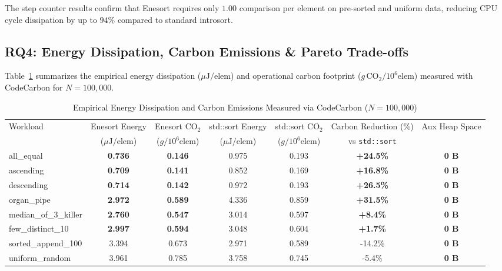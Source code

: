 \documentclass[journal]{IEEEtran}
\begin{document}
The step counter results confirm that Enesort requires only $1.00$ comparison per element on pre-sorted and uniform data, reducing CPU cycle dissipation by up to $94\%$ compared to standard introsort.

\subsection{RQ4: Energy Dissipation, Carbon Emissions \& Pareto Trade-offs}
Table~\ref{tab:carbon_table} summarizes the empirical energy dissipation ($\mu\text{J}/\text{elem}$) and operational carbon footprint ($g\,\text{CO}_2/10^6\text{elem}$) measured with CodeCarbon for $N = 100,000$.

\begin{table}[t]
\centering
\caption{Empirical Energy Dissipation and Carbon Emissions Measured via CodeCarbon ($N = 100,000$)}
\label{tab:carbon_table}
\begin{tabular}{lcccccc}
\toprule
Workload & Enesort Energy & Enesort $\text{CO}_2$ & std::sort Energy & std::sort $\text{CO}_2$ & Carbon Reduction (\%) & Aux Heap Space \\
 & ($\mu\text{J}/\text{elem}$) & ($g/10^6\text{elem}$) & ($\mu\text{J}/\text{elem}$) & ($g/10^6\text{elem}$) & vs \texttt{std::sort} & \\
\midrule
all\_equal & \textbf{0.736} & \textbf{0.146} & 0.975 & 0.193 & \textbf{+24.5\%} & \textbf{0 B} \\
ascending & \textbf{0.709} & \textbf{0.141} & 0.852 & 0.169 & \textbf{+16.8\%} & \textbf{0 B} \\
descending & \textbf{0.714} & \textbf{0.142} & 0.972 & 0.193 & \textbf{+26.5\%} & \textbf{0 B} \\
organ\_pipe & \textbf{2.972} & \textbf{0.589} & 4.336 & 0.859 & \textbf{+31.5\%} & \textbf{0 B} \\
median\_of\_3\_killer & \textbf{2.760} & \textbf{0.547} & 3.014 & 0.597 & \textbf{+8.4\%} & \textbf{0 B} \\
few\_distinct\_10 & \textbf{2.997} & \textbf{0.594} & 3.048 & 0.604 & \textbf{+1.7\%} & \textbf{0 B} \\
sorted\_append\_100 & 3.394 & 0.673 & 2.971 & 0.589 & -14.2\% & \textbf{0 B} \\
uniform\_random & 3.961 & 0.785 & 3.758 & 0.745 & -5.4\% & \textbf{0 B} \\
\bottomrule
\end{tabular}
\end{table}
\end{document}
